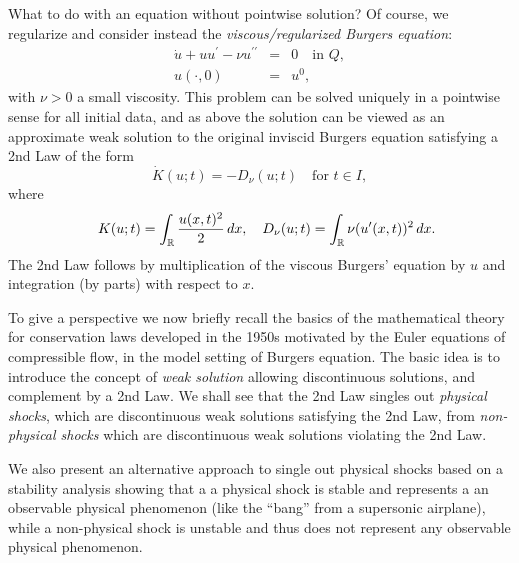 What to do with an equation without pointwise solution? 
Of course, we regularize and consider instead the 
\emph{viscous/regularized Burgers equation}:
\begin{equation}\label{burgersreg}
\begin{array}{rcl}
\dot u +uu^\prime  -\nu u^{\prime\prime}&=&  0\quad \mbox{in }Q,\\
u(\cdot ,0)  &=&  u^0,
\end{array}
\end{equation} 
with $\nu >0$ a small viscosity. This problem can be solved
uniquely in a pointwise sense for all initial data, 
and as above the solution can be viewed as an approximate weak
solution to the original inviscid Burgers equation satisfying a 2nd
Law of the form
\begin{equation}\label{2ndlawBurgers}
\dot K(u;t)=-D_\nu (u;t)\quad\mbox{for }t\in I,
\end{equation}
where
\begin{equation}\label{KD}
\quad K(u;t)=\int_{\mathbb{R}} \frac{u(x,t)^2}{2}\, dx,\quad
D_\nu (u;t)=\int_{\mathbb{R}}\nu (u^\prime (x,t))^2\, dx.
\end{equation} 
The 2nd Law follows by multiplication of the viscous
Burgers' equation by $u$ and integration (by parts) with respect to $x$.


To give a perspective we now briefly recall the  
basics of the mathematical theory for conservation laws developed
in the 1950s motivated by the Euler equations of compressible
flow, in the model setting of Burgers equation. The basic idea is
to introduce the concept of \emph{weak solution} allowing discontinuous
solutions, and complement by a 2nd Law.  We shall see that the 2nd Law
singles out \emph{physical shocks}, which are discontinuous
weak solutions satisfying the 2nd Law, from \emph{non-physical shocks}
which are discontinuous weak solutions violating the 2nd Law.

We also present an alternative approach 
to single out physical shocks based on a stability analysis showing that a
a physical shock is stable and represents a
an observable physical phenomenon 
(like the ``bang'' from a supersonic airplane), 
while a non-physical shock is unstable and thus does not represent
any observable physical phenomenon.



